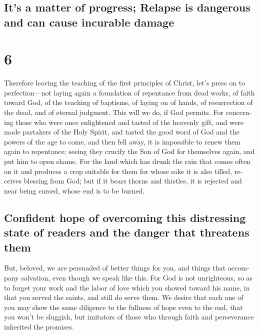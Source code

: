 \begin{paracol}{2}
\begin{otherlanguage}{english}
\hypertarget{its-a-matter-of-progress-relapse-is-dangerous-and-can-cause-incurable-damage}{%
\subsection{It's a matter of progress; Relapse is dangerous and can
cause incurable
damage}\label{its-a-matter-of-progress-relapse-is-dangerous-and-can-cause-incurable-damage}}

\hypertarget{section-11}{%
\section{6}\label{section-11}}

 Therefore leaving the teaching of the first principles of
Christ, let's press on to perfection---not laying again a foundation of
repentance from dead works, of faith toward God,  of the
teaching of baptisms, of laying on of hands, of resurrection of the
dead, and of eternal judgment.  This will we do, if God
permits.  For concerning those who were once enlightened
and tasted of the heavenly gift, and were made partakers of the Holy
Spirit,  and tasted the good word of God and the powers of
the age to come,  and then fell away, it is impossible to
renew them again to repentance; seeing they crucify the Son of God for
themselves again, and put him to open shame.  For the land
which has drunk the rain that comes often on it and produces a crop
suitable for them for whose sake it is also tilled, receives blessing
from God;  but if it bears thorns and thistles, it is
rejected and near being cursed, whose end is to be burned.

\hypertarget{confident-hope-of-overcoming-this-distressing-state-of-readers-and-the-danger-that-threatens-them}{%
\subsection{Confident hope of overcoming this distressing state of
readers and the danger that threatens
them}\label{confident-hope-of-overcoming-this-distressing-state-of-readers-and-the-danger-that-threatens-them}}

 But, beloved, we are persuaded of better things for you,
and things that accompany salvation, even though we speak like this.
 For God is not unrighteous, so as to forget your work
and the labor of love which you showed toward his name, in that you
served the saints, and still do serve them.  We desire
that each one of you may show the same diligence to the fullness of hope
even to the end,  that you won't be sluggish, but
imitators of those who through faith and perseverance inherited the
promises.


\end{otherlanguage}
\end{paracol}

